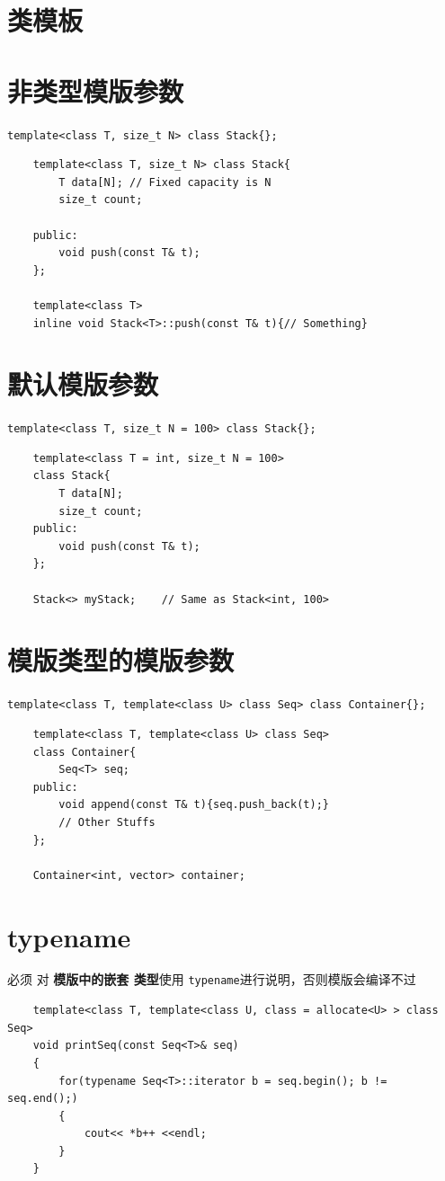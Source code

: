 \documentclass[UTF8,a4paper,12pt]{ctexbook}
\begin{document}
\section{类模板}



\section{非类型模版参数}
	\verb|template<class T, size_t N> class Stack{};|
	\begin{lstlisting}
	template<class T, size_t N> class Stack{
		T data[N]; // Fixed capacity is N
		size_t count;
		
	public:
		void push(const T& t);
	};
	
	template<class T>
	inline void Stack<T>::push(const T& t){// Something}
	\end{lstlisting}

\section{默认模版参数}
	\verb|template<class T, size_t N = 100> class Stack{};|
	
	\begin{lstlisting}
	template<class T = int, size_t N = 100>
	class Stack{
		T data[N];
		size_t count;
	public:
		void push(const T& t);
	};
	
	Stack<> myStack; 	// Same as Stack<int, 100>
	\end{lstlisting}
	
\section{模版类型的模版参数}
	\verb|template<class T, template<class U> class Seq> class Container{};|
	
	\begin{lstlisting}
	template<class T, template<class U> class Seq>
	class Container{
		Seq<T> seq;
	public:
		void append(const T& t){seq.push_back(t);}
		// Other Stuffs
	};
	
	Container<int, vector> container;
	\end{lstlisting}
	
\section{typename}
	 必须 对 \textbf{模版中的嵌套 类型}使用 \verb|typename|进行说明，否则模版会编译不过
	\begin{lstlisting}
	template<class T, template<class U, class = allocate<U> > class Seq>
	void printSeq(const Seq<T>& seq)
	{
		for(typename Seq<T>::iterator b = seq.begin(); b != seq.end();)
		{
			cout<< *b++ <<endl;
		}
	}
	\end{lstlisting}
	
\end{document}
